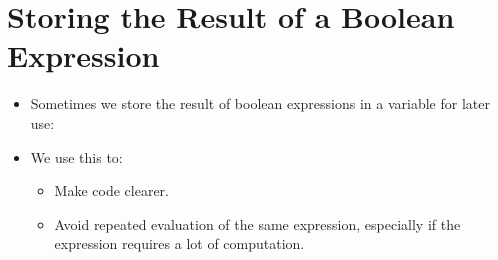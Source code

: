 \documentclass[letterpaper,10pt,english]{sphinxmanual}
\begin{document}
\section{Storing the Result of a Boolean Expression}
\label{\detokenize{lecture_notes/lec11_conditionals2:storing-the-result-of-a-boolean-expression}}\begin{itemize}
\item {} 
Sometimes we store the result of boolean expressions in a variable
for later use:

\begin{sphinxVerbatim}[commandchars=\\\{\}]
  
    
 
\end{sphinxVerbatim}

\item {} 
We use this to:
\begin{itemize}
\item {} 
Make code clearer.

\item {} 
Avoid repeated evaluation of the same expression, especially if
the expression requires a lot of computation.

\end{itemize}

\end{itemize}
\end{document}
